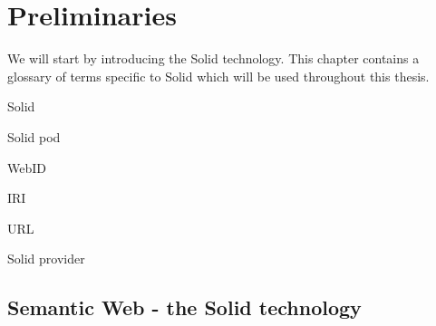 \chapter{Preliminaries}
We will start by introducing the Solid technology.
This chapter contains a glossary of terms specific to Solid which will be used throughout this thesis.

Solid

Solid pod

WebID

IRI

URL

Solid provider

\section{Semantic Web - the Solid technology}
